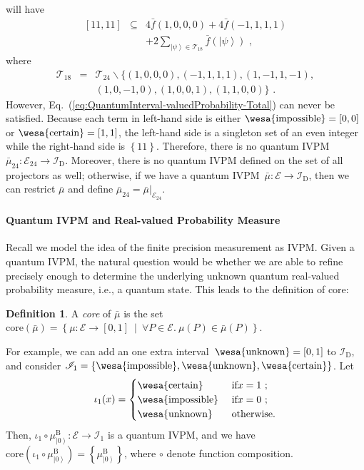 \documentclass[english,reprint, aps, prl,superscriptaddress, showpacs,
showkeys]{revtex4-1}
\theoremstyle{plain}
\theoremstyle{definition}
\newtheorem{definition}[thm]{Definition}
\newcommand{\events}{\ensuremath{\mathcal{E}}}
\newcommand{\pmeas}{\ensuremath{\mu}}
\newcommand{\imposs}{{\mbox{\wesa{impossible}}}}
\newcommand{\necess}{{\mbox{\wesa{certain}}}}
\newcommand{\unknown}{{\mbox{\wesa{unknown}}}}
\newcommand{\ket}[1]{{\left\vert{#1}\right\rangle}}
\newcommand{\set}[2]{\ensuremath{\left\{ {#1}~\middle|~{#2}\right\} }}
\begin{document}
will have
\begin{eqnarray}
\left[11,11\right] & \subseteq & 4\bar{f}(1,0,0,0)+4\bar{f}(-1,1,1,1)\nonumber \\
 &  & +2\sum_{\ket{\psi}\in\mathcal{T}_{18}}\bar{f}\left(\ket{\psi}\right)\textrm{ ,}\label{eq:QuantumInterval-valuedProbability-Total}
\end{eqnarray}
where 
\begin{eqnarray}
\mathcal{T}_{18} & = & \mathcal{T}_{24}\backslash\{(1,0,0,0),(-1,1,1,1),(1,-1,1,-1),\nonumber \\
 &  & (1,0,-1,0),(1,0,0,1),(1,1,0,0)\}\textrm{ .}
\end{eqnarray}
However, Eq.~(\ref{eq:QuantumInterval-valuedProbability-Total})
can never be satisfied. Because each term in left-hand side is either
$\imposs=\left[0,0\right]$ or $\necess=\left[1,1\right]$, the left-hand
side is a singleton set of an even integer while the right-hand side
is $\left\{ 11\right\} $. Therefore, there is no quantum IVPM~$\bar{\mu}_{24}:\events_{24}\rightarrow\mathscr{I}_{\mathrm{D}}$.
Moreover, there is no quantum IVPM defined on the set of all projectors
as well; otherwise, if we have a quantum IVPM~$\bar{\mu}:\events\rightarrow\mathscr{I}_{\mathrm{D}}$,
then we can restrict $\bar{\mu}$ and define $\bar{\mu}_{24}=\left.\bar{\mu}\right|_{\events_{24}}$.

\paragraph{Quantum IVPM and Real-valued Probability Measure}

Recall we model the idea of the finite precision measurement as IVPM.
Given a quantum IVPM, the natural question would be whether we are
able to refine precisely enough to determine the underlying unknown
quantum real-valued probability measure, i.e., a quantum state. This
leads to the definition of core:\begin{definition}A \emph{core} of
$\bar{\mu}$ is the set $\mathrm{core}\left(\bar{\mu}\right)=\set{\pmeas:\events\rightarrow[0,1]}{\forall P\in\events.~\pmeas\left(P\right)\in\bar{\mu}\left(P\right)}$.\end{definition}For
example, we can add an one extra interval~$\unknown=\left[0,1\right]$
to $\mathscr{I}_{\mathrm{D}}$, and consider $\mathscr{I}_{1}=\left\{ \imposs,\unknown,\necess\right\} $.
Let 
\begin{equation}
\iota_{1}(x)=\begin{cases}
\necess & \text{ if}x=1\text{ ;}\\
\imposs & \text{ if}x=0\text{ ;}\\
\unknown & \text{ otherwise.}
\end{cases}\label{eq:homomorphism-1}
\end{equation}
Then, $\iota_{1}\circ\mu_{\ket{0}}^{\mathrm{\mathrm{B}}}:\events\rightarrow\mathscr{I}_{1}$
is a quantum IVPM, and we have $\mathrm{core}\left(\iota_{1}\circ\mu_{\ket{0}}^{\mathrm{\mathrm{B}}}\right)=\left\{ \mu_{\ket{0}}^{\mathrm{\mathrm{B}}}\right\} $,
where $\circ$ denote function composition.
\end{document}
